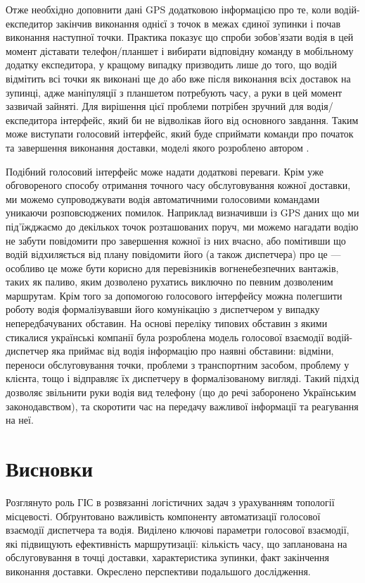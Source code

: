 Отже необхідно доповнити дані GPS додатковою інформацією про те, коли водій-експедитор закінчив виконання однієї з точок в межах єдиної зупинки і почав виконання наступної точки. Практика показує що спроби зобов’язати водія в цей момент діставати телефон/планшет і вибирати відповідну команду в мобільному додатку експедитора, у кращому випадку призводить лише до того, що водій відмітить всі точки як виконані ще до або вже після виконання всіх доставок на зупинці, адже маніпуляції з планшетом потребують часу, а руки в цей момент зазвичай зайняті. Для вирішення цієї проблеми потрібен зручний для водія/експедитора інтерфейс, який би не відволікав його від основного завдання. Таким може виступати голосовий інтерфейс, який буде сприймати команди про початок та завершення виконання доставки, моделі якого розроблено автором \cite{eng_art2}.

Подібний голосовий інтерфейс може надати додаткові переваги. Крім уже обговореного способу отримання точного часу обслуговування кожної доставки, ми можемо супроводжувати водія автоматичними голосовими командами уникаючи розповсюджених помилок. Наприклад визначивши із GPS даних що ми під'їжджаємо до декількох точок розташованих поруч, ми можемо нагадати водію не забути повідомити про завершення кожної із них вчасно, або помітивши що водій відхиляється від плану повідомити його (а також диспетчера) про це — особливо це може бути корисно для перевізників вогненебезпечних вантажів, таких як паливо, яким дозволено рухатись виключно по певним дозволеним маршрутам. Крім того за допомогою голосового інтерфейсу можна полегшити роботу водія формалізувавши його комунікацію з диспетчером у випадку непередбачуваних обставин. На основі переліку типових обставин з якими стикалися українські компанії була розроблена модель голосової взаємодії водій-диспетчер яка приймає від водія інформацію про наявні обставини: відміни, переноси обслуговування точки, проблеми з транспортним засобом, проблему у клієнта, тощо і відправляє їх диспетчеру в формалізованому вигляді. Такий підхід дозволяє звільнити руки водія вид телефону (що до речі заборонено Українським законодавством), та скоротити час на передачу важливої інформації та реагування на неї.

\section{Висновки}

Розглянуто роль ГІС в розвязанні логістичних задач з урахуванням топології місцевості. Обґрунтовано важливість компоненту автоматизації голосової взаємодії диспетчера та водія. Виділено ключові параметри голосової взаємодії, які підвищують ефективність маршрутизації: кількість часу, що запланована на обслуговування в точці доставки, характеристика зупинки, факт закінчення виконання доставки. Окреслено перспективи подальшого дослідження.